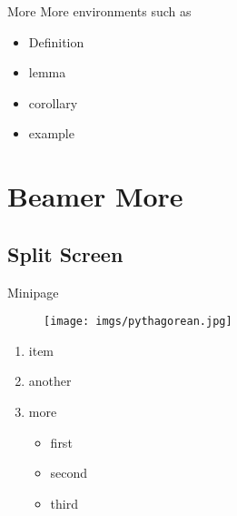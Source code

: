 \begin{frame}{More}
    More environments such as

    \begin{itemize}
        \item Definition
        \item lemma
        \item corollary
        \item example
    \end{itemize}
\end{frame}

\section{Beamer More}

\subsection{Split Screen}

\begin{frame}{Minipage}
    \begin{minipage}{0.5\linewidth}
        \begin{figure}[h]
            \texttt{[image: imgs/pythagorean.jpg]}
        \end{figure}
    \end{minipage}%
    \hfill
    \begin{minipage}{0.4\linewidth}
        \begin{enumerate}
            \item item
            \item another
            \item more
            \begin{itemize}
                \item first
                \item second
                \item third
            \end{itemize}
        \end{enumerate}
    \end{minipage}
\end{frame}

